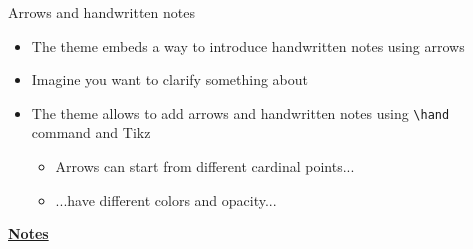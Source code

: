 \documentclass[10pt]{beamer}
\begin{document}
\begin{frame}[t]
    {Arrows and handwritten notes}\bigskip
    \begin{itemize}
        \item The theme embeds a way to introduce handwritten notes using arrows \bigskip\medskip
        \item Imagine you want to clarify something about  \bigskip\medskip
        \item The theme allows to add arrows and handwritten notes using \texttt{\textbackslash hand} command and Tikz \medskip
        \begin{itemize}
            \item Arrows can start from different cardinal points... \medskip
            \item ...have different colors and opacity... \medskip
        \end{itemize}
    \end{itemize}
\end{frame}
\begin{flushleft}
    \underline{\textbf{Notes}}\setlength{\parskip}{.15cm}\notesize\newline\par
\end{flushleft}
\end{document}
